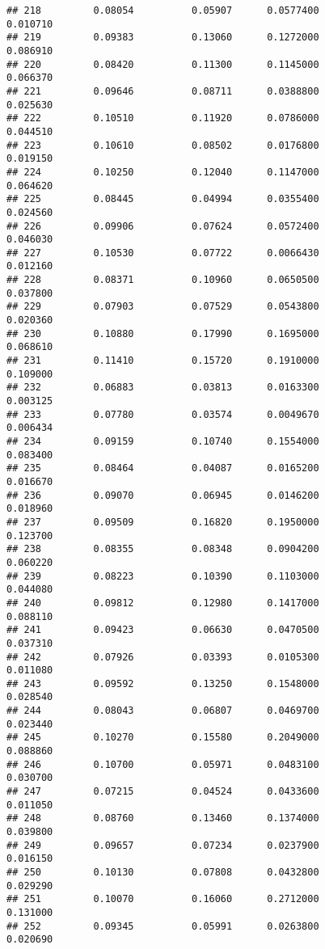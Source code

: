 \documentclass[
]{article}
\begin{document}
\begin{verbatim}
## 218         0.08054          0.05907      0.0577400            0.010710
## 219         0.09383          0.13060      0.1272000            0.086910
## 220         0.08420          0.11300      0.1145000            0.066370
## 221         0.09646          0.08711      0.0388800            0.025630
## 222         0.10510          0.11920      0.0786000            0.044510
## 223         0.10610          0.08502      0.0176800            0.019150
## 224         0.10250          0.12040      0.1147000            0.064620
## 225         0.08445          0.04994      0.0355400            0.024560
## 226         0.09906          0.07624      0.0572400            0.046030
## 227         0.10530          0.07722      0.0066430            0.012160
## 228         0.08371          0.10960      0.0650500            0.037800
## 229         0.07903          0.07529      0.0543800            0.020360
## 230         0.10880          0.17990      0.1695000            0.068610
## 231         0.11410          0.15720      0.1910000            0.109000
## 232         0.06883          0.03813      0.0163300            0.003125
## 233         0.07780          0.03574      0.0049670            0.006434
## 234         0.09159          0.10740      0.1554000            0.083400
## 235         0.08464          0.04087      0.0165200            0.016670
## 236         0.09070          0.06945      0.0146200            0.018960
## 237         0.09509          0.16820      0.1950000            0.123700
## 238         0.08355          0.08348      0.0904200            0.060220
## 239         0.08223          0.10390      0.1103000            0.044080
## 240         0.09812          0.12980      0.1417000            0.088110
## 241         0.09423          0.06630      0.0470500            0.037310
## 242         0.07926          0.03393      0.0105300            0.011080
## 243         0.09592          0.13250      0.1548000            0.028540
## 244         0.08043          0.06807      0.0469700            0.023440
## 245         0.10270          0.15580      0.2049000            0.088860
## 246         0.10700          0.05971      0.0483100            0.030700
## 247         0.07215          0.04524      0.0433600            0.011050
## 248         0.08760          0.13460      0.1374000            0.039800
## 249         0.09657          0.07234      0.0237900            0.016150
## 250         0.10130          0.07808      0.0432800            0.029290
## 251         0.10070          0.16060      0.2712000            0.131000
## 252         0.09345          0.05991      0.0263800            0.020690

\end{verbatim}
\end{document}
